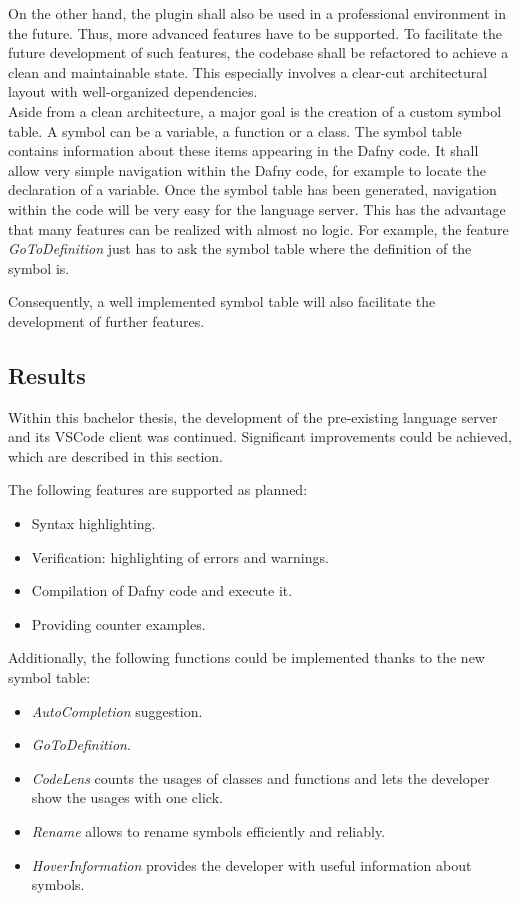 On the other hand, the plugin shall also be used in a professional environment in the future.
Thus, more advanced features have to be supported.
To facilitate the future development of such features, the codebase shall be refactored to achieve a clean and maintainable state.
This especially involves a clear-cut architectural layout with well-organized dependencies.\\

Aside from a clean architecture, a major goal is the creation of a custom symbol table.
A symbol can be a variable, a function or a class.
The symbol table contains information about these items appearing in the Dafny code.
It shall allow very simple navigation within the Dafny code, for example to locate the declaration of a variable.
Once the symbol table has been generated, navigation within the code will be very easy for the language server.
This has the advantage that many features can be realized with almost no logic.
For example, the feature \textit{\textit{GoToDefinition}} just has to ask the symbol table where the definition of the symbol is.

Consequently, a well implemented symbol table will also facilitate the development of further features.

\subsection{Results}
Within this bachelor thesis, the development of the pre-existing language server and its VSCode client was continued.
Significant improvements could be achieved, which are described in this section.

The following features are supported as planned:
\begin{itemize}
    \item Syntax highlighting.
    \item Verification: highlighting of errors and warnings.
    \item Compilation of Dafny code and execute it.
    \item Providing counter examples.
\end{itemize}

Additionally, the following functions could be implemented thanks to the new symbol table:
\begin{itemize}
    \item \textit{AutoCompletion} suggestion.
    \item \textit{GoToDefinition}.
    \item \textit{CodeLens} counts the usages of classes and functions and lets the developer show the usages with one click.
    \item \textit{Rename} allows to rename symbols efficiently and reliably.
    \item \textit{HoverInformation} provides the developer with useful information about symbols.
\end{itemize}

